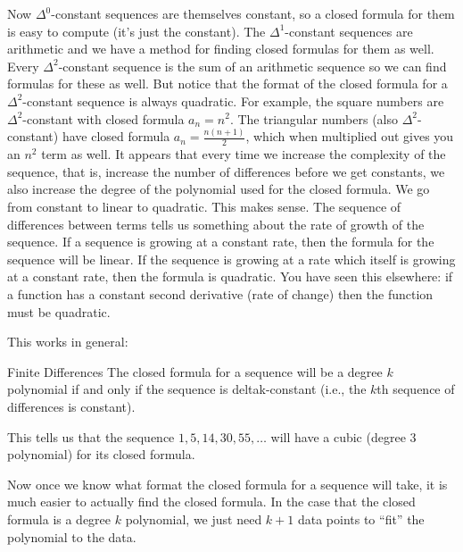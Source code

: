 \documentclass[12pt]{article}
\begin{document}
Now $\Delta^0$-constant sequences are themselves constant, so a closed formula for them is easy to compute (it's just the constant). The $\Delta^1$-constant sequences are arithmetic and we have a method for finding closed formulas for them as well.  Every $\Delta^2$-constant sequence is the sum of an arithmetic sequence so we can find formulas for these as well.  But notice that the format of the closed formula for a $\Delta^2$-constant sequence is always quadratic.  For example, the square numbers are $\Delta^2$-constant with closed formula $a_n= n^2$.  The triangular numbers (also $\Delta^2$-constant) have closed formula $a_n = \frac{n(n+1)}{2}$, which when multiplied out gives you an $n^2$ term as well.  It appears that every time we increase the complexity of the sequence, that is, increase the number of differences before we get constants, we also increase the degree of the polynomial used for the closed formula.  We go from constant to linear to quadratic.  This makes sense.  The sequence of differences between terms tells us something about the rate of growth of the sequence.  If a sequence is growing at a constant rate, then the formula for the sequence will be linear.  If the sequence is growing at a rate which itself is growing at a constant rate, then the formula is quadratic.  You have seen this elsewhere: if a function has a constant second derivative (rate of change) then the function must be quadratic.

This works in general:

\begin{defbox}{Finite Differences}
The closed formula for a sequence will be a degree $k$ polynomial if and only if the sequence is \gls{deltak}-constant (i.e., the $k$th sequence of differences is constant).
\end{defbox}

This tells us that the sequence $1, 5, 14, 30, 55, \ldots$ will have a cubic (degree 3 polynomial) for its closed formula.  

Now once we know what format the closed formula for a sequence will take, it is much easier to actually find the closed formula.  In the case that the closed formula is a degree $k$ polynomial, we just need $k+1$ data points to ``fit'' the polynomial to the data.
\end{document}
